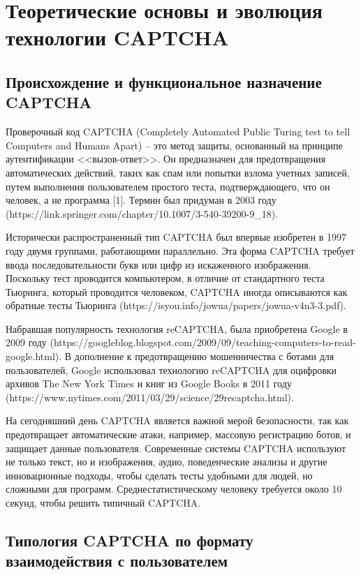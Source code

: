 \chapter{Теоретические основы и эволюция технологии CAPTCHA}

\section{Происхождение и функциональное назначение CAPTCHA}

Проверочный код CAPTCHA (Completely Automated Public Turing test to tell Computers 
and Humans Apart) -- это метод защиты, основанный на принципе аутентификации 
<<вызов-ответ>>. Он предназначен для предотвращения автоматических действий, таких 
как спам или попытки взлома учетных записей, путем выполнения пользователем 
простого теста, подтверждающего, что он человек, а не программа [1]. Термин был 
придуман в 2003 году (https://link.springer.com/chapter/10.1007/3-540-39200-9\_18).

Исторически распространенный тип CAPTCHA был впервые изобретен в 1997 году двумя 
группами, работающими параллельно. Эта форма CAPTCHA требует ввода 
последовательности букв или цифр из искаженного изображения. Поскольку тест 
проводится компьютером, в отличие от стандартного теста Тьюринга, который 
проводится человеком, CAPTCHA иногда описываются как обратные тесты Тьюринга 
(https://isyou.info/jowua/papers/jowua-v4n3-3.pdf).

Набравшая популярность технология reCAPTCHA, была приобретена Google в 2009 году 
(https://googleblog.blogspot.com/2009/09/teaching-computers-to-read-google.html). 
В дополнение к предотвращению мошенничества с ботами для пользователей, Google 
использовал технологию reCAPTCHA для оцифровки архивов The New York Times и книг 
из Google Books в 2011 году (https://www.nytimes.com/2011/03/29/science/29recaptcha.html).

На сегодняшний день CAPTCHA является важной мерой безопасности, так как 
предотвращает автоматические атаки, например, массовую регистрацию ботов, и 
защищает данные пользователя. Современные системы CAPTCHA используют не только 
текст, но и изображения, аудио, поведенческие анализы и другие инновационные 
подходы, чтобы сделать тесты удобными для людей, но сложными для программ. 
Среднестатистическому человеку требуется около 10 секунд, чтобы решить типичный 
CAPTCHA.

\section{Типология CAPTCHA по формату взаимодействия с пользователем}


